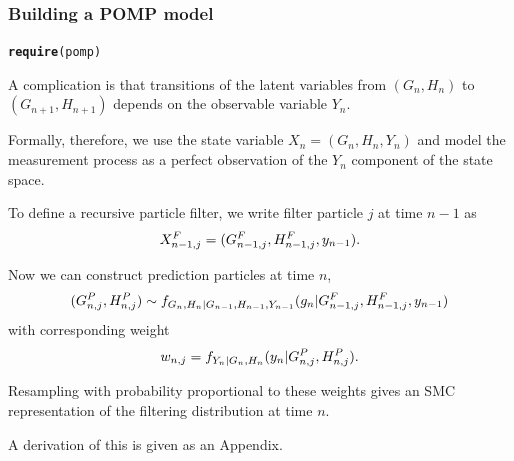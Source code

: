 \documentclass{beamer}\usepackage[]{graphicx}\usepackage[]{color}
\makeatletter
\newcommand{\hlstd}[1]{\textcolor[rgb]{0.345,0.345,0.345}{#1}}%
\newcommand{\hlkwd}[1]{\textcolor[rgb]{0.737,0.353,0.396}{\textbf{#1}}}%
\newenvironment{kframe}{%
 \def\at@end@of@kframe{}%
 \ifinner\ifhmode%
  \def\at@end@of@kframe{\end{minipage}}%
  \begin{minipage}{\columnwidth}%
 \fi\fi%
 \def\FrameCommand##1{\hskip\@totalleftmargin \hskip-\fboxsep
 \colorbox{shadecolor}{##1}\hskip-\fboxsep
     \hskip-\linewidth \hskip-\@totalleftmargin \hskip\columnwidth}%
 \MakeFramed {\advance\hsize-\width
   \@totalleftmargin\z@ \linewidth\hsize
   \@setminipage}}%
 {\par\unskip\endMakeFramed%
 \at@end@of@kframe}
\newenvironment{knitrout}{}{} %
\makeatother
\begin{document}
\begin{frame}[fragile]

\frametitle{Building a POMP model}

\begin{knitrout}\small
{}\color{fgcolor}\begin{kframe}
\begin{alltt}
\hlkwd{require}\hlstd{(pomp)}
\end{alltt}
\end{kframe}
\end{knitrout}

\bi

\item A complication is that transitions of the latent variables from $(G_n,H_n)$ to $(G_{n+1},H_{n+1})$ depends on the observable variable $Y_{n}$. 

\item Formally, therefore, we use the state variable $X_n=(G_{n},H_{n},Y_{n})$ and model the measurement process as a perfect observation of the $Y_n$ component of the state space. 

\item To define a recursive particle filter, we write filter particle $j$ at time $n-1$ as 
$$ X^F_{n-1,j}=(G^F_{n-1,j},H^F_{n-1,j},y_{n-1}).$$

\item Now we can construct prediction particles at time $n$,
$$(G^P_{n,j},H^P_{n,j})\sim f_{G_{n},H_n|G_{n-1},H_{n-1},Y_{n-1}}(g_n|G^F_{n-1,j},H^F_{n-1,j},y_{n-1})$$
with corresponding weight 
$$w_{n,j}=f_{Y_n|G_n,H_n}(y_n|G^P_{n,j},H^P_{n,j}).$$

\item Resampling with probability proportional to these weights gives an SMC representation of the filtering distribution at time $n$.

\item A derivation of this is given as an Appendix. 


\ei


\end{frame}
\end{document}
